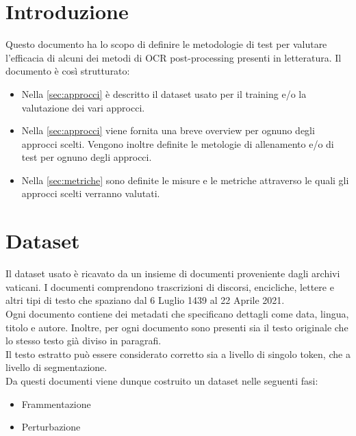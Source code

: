 \documentclass[12pt]{article}
\begin{document}
\maketitle
\newcommand{\cz}{$c$}
\newcommand{\cp}{$c\prime$}
\newcommand{\cs}{$c\prime\prime$}


\section{Introduzione}
Questo documento ha lo scopo di definire le metodologie di test per valutare l'efficacia di alcuni dei metodi di OCR post-processing presenti in letteratura. Il documento è così strutturato:
\begin{itemize}
\item Nella \autoref{sec:approcci} è descritto il dataset usato per il training e/o la valutazione dei vari approcci.
\item Nella \autoref{sec:approcci} viene fornita una breve overview per ognuno degli approcci scelti. Vengono inoltre definite le metologie di allenamento e/o di test per ognuno degli approcci.
\item Nella \autoref{sec:metriche} sono definite le misure e le metriche attraverso le quali gli approcci scelti verranno valutati.
\end{itemize}


\section{Dataset} \label{sec:dataset}
Il dataset usato è ricavato da un insieme di documenti proveniente dagli archivi vaticani. I documenti comprendono trascrizioni di discorsi, encicliche, lettere e altri tipi di testo che spaziano dal 6 Luglio 1439 al 22 Aprile 2021.\\
Ogni documento contiene dei metadati che specificano dettagli come data, lingua, titolo e autore. Inoltre, per ogni documento sono presenti sia il testo originale che lo stesso testo già diviso in paragrafi.\\
Il testo estratto può essere considerato corretto sia a livello di singolo token, che a livello di segmentazione. \\
Da questi documenti viene dunque costruito un dataset nelle seguenti fasi:
\begin{itemize}
\item Frammentazione
\item Perturbazione
\end{itemize}
\end{document}
